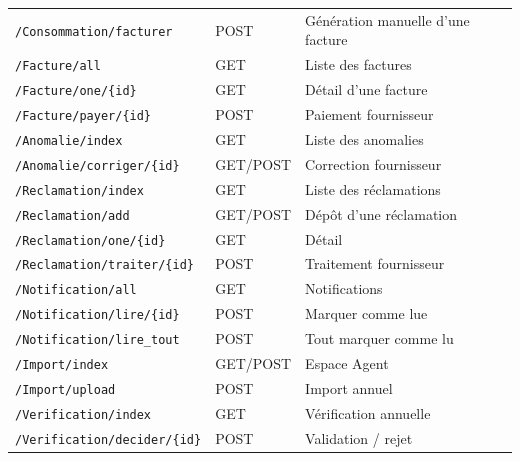 {\begin{longtable}{>{\raggedright\arraybackslash}p{}p{}>{\raggedright\arraybackslash}p{}}
\texttt{/Consommation/facturer} & POST & Génération manuelle d'une facture \\
\texttt{/Facture/all} & GET & Liste des factures \\
\texttt{/Facture/one/\{id\}} & GET & Détail d'une facture \\
\texttt{/Facture/payer/\{id\}} & POST & Paiement fournisseur \\
\texttt{/Anomalie/index} & GET & Liste des anomalies \\
\texttt{/Anomalie/corriger/\{id\}} & GET/POST & Correction fournisseur \\
\texttt{/Reclamation/index} & GET & Liste des réclamations \\
\texttt{/Reclamation/add} & GET/POST & Dépôt d'une réclamation \\
\texttt{/Reclamation/one/\{id\}} & GET & Détail \\
\texttt{/Reclamation/traiter/\{id\}} & POST & Traitement fournisseur \\
\texttt{/Notification/all} & GET & Notifications \\
\texttt{/Notification/lire/\{id\}} & POST & Marquer comme lue \\
\texttt{/Notification/lire\_tout} & POST & Tout marquer comme lu \\
\texttt{/Import/index} & GET/POST & Espace Agent \\
\texttt{/Import/upload} & POST & Import annuel \\
\texttt{/Verification/index} & GET & Vérification annuelle \\
\texttt{/Verification/decider/\{id\}} & POST & Validation / rejet \\
\bottomrule
\end{longtable}
}
